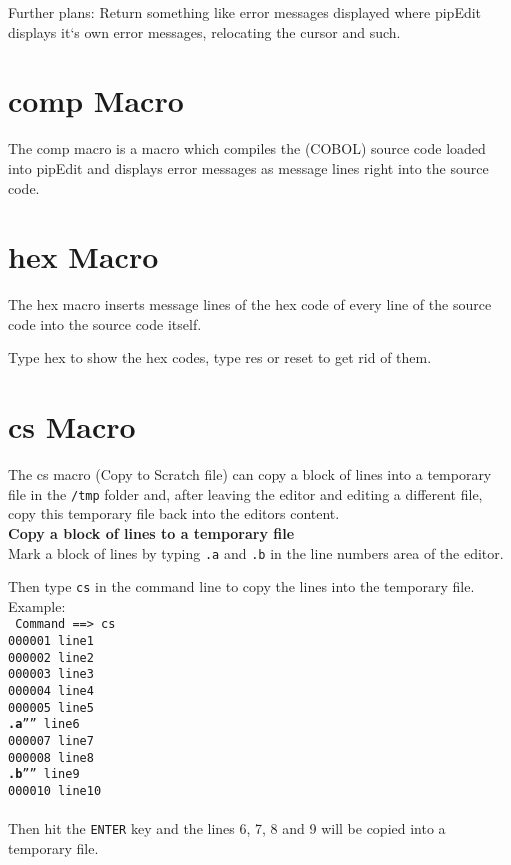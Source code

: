 \documentclass{report}
\begin{document}
Further plans: Return something like error messages displayed where pipEdit 
displays it‘s own error messages, relocating the cursor and such.

\chapter{comp Macro}
The comp macro is a macro which compiles the (COBOL) source code loaded into pipEdit and displays error messages as message lines right into the source code.



\chapter{hex Macro}

The hex macro inserts message lines of the hex code of every line of the source code into the source code itself.

Type hex to show the hex codes, type res or reset to get rid of them.



\chapter{cs Macro}

The cs macro (Copy to Scratch file) can copy a block of lines into a temporary
file in the \texttt{/tmp} folder and, after leaving the editor and editing a different file,  copy this temporary file back into the editors content. \\


\textbf{Copy a block of lines to a temporary file} \\
Mark a block of lines by typing \texttt{.a} and \texttt{.b} in the line numbers
area of the editor.

Then type \texttt{cs} in the command line to copy the lines into the temporary
file. \\

Example: \\

\texttt{
Command ==> cs \\
000001 line1 \\
000002 line2 \\
000003 line3 \\
000004 line4 \\
000005 line5 \\
\textbf{.a}'''' line6 \\
000007 line7 \\
000008 line8 \\
\textbf{.b}'''' line9 \\
000010 line10 \\
} \\
\break
Then hit the \texttt{ENTER} key and the lines 6, 7, 8 and 9 will be copied
into a temporary file.
\\
\\
\end{document}

